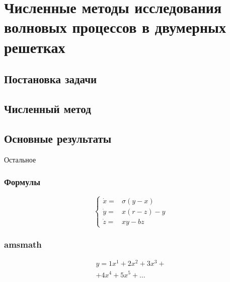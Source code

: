 \section{Численные методы исследования волновых процессов в двумерных решетках}
\subsection{Постановка задачи}
\subsection{Численный метод}
\subsection{Основные результаты}
\begin{frame}
    \begin{center}
        \Huge
        Остальное
    \end{center}
\end{frame}


\begin{frame}
    \frametitle{Формулы}
    \[
    \left\{
    \begin{array}{rl}
        \dot x = & \sigma (y-x)  \\
        \dot y = & x (r - z) - y \\
        \dot z = & xy - bz
    \end{array}
    \right.
    \]
\end{frame}

\begin{frame}
    \frametitle{amsmath}
    \centering
    \begin{minipage}[t]{0.5\linewidth}
        \begin{multline*}
            y = 1 x^1 + 2 x^2 + 3 x^3 + \\ + 4 x^4 + 5 x^5 + \dots
        \end{multline*}
    \end{minipage}
\end{frame}

